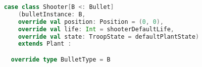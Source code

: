 \begin{lstlisting}[language=Scala, label=code:plant-shooter caption=Type class Shooter.]
case class Shooter[B <: Bullet]
    (bulletInstance: B,
    override val position: Position = (0, 0),
    override val life: Int = shooterDefaultLife,
    override val state: TroopState = defaultPlantState)
    extends Plant :

  override type BulletType = B
\end{lstlisting}